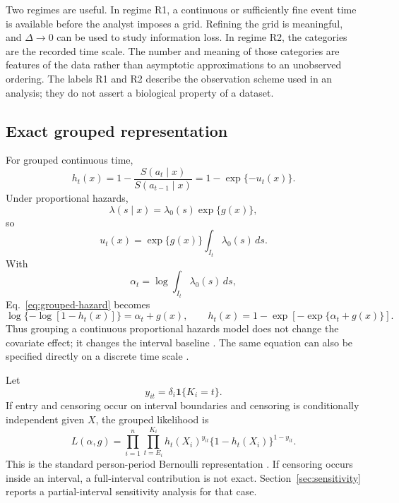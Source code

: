 \documentclass[smallextended,natbib]{svjour3}
\begin{document}
Two regimes are useful. In regime R1, a continuous or sufficiently fine event time is available before the analyst imposes a grid. Refining the grid is meaningful, and $\Delta\to0$ can be used to study information loss. In regime R2, the categories are the recorded time scale. The number and meaning of those categories are features of the data rather than asymptotic approximations to an unobserved ordering. The labels R1 and R2 describe the observation scheme used in an analysis; they do not assert a biological property of a dataset.

\subsection{Exact grouped representation}
\label{sec:grouped-representation}

For grouped continuous time,
\begin{equation}
h_t(x)=1-\frac{S(a_t\mid x)}{S(a_{t-1}\mid x)}
       =1-\exp\{-u_t(x)\}.
\label{eq:grouped-hazard}
\end{equation}
Under proportional hazards,
\begin{equation}
\lambda(s\mid x)=\lambda_0(s)\exp\{g(x)\},
\label{eq:ph}
\end{equation}
so
\begin{equation}
u_t(x)=\exp\{g(x)\}\int_{I_t}\lambda_0(s)\,ds.
\end{equation}
With
\begin{equation}
\alpha_t=\log\int_{I_t}\lambda_0(s)\,ds,
\end{equation}
Eq.~\eqref{eq:grouped-hazard} becomes
\begin{equation}
\log\{-\log[1-h_t(x)]\}=\alpha_t+g(x),
\qquad
h_t(x)=1-\exp[-\exp\{\alpha_t+g(x)\}].
\label{eq:cloglog}
\end{equation}
Thus grouping a continuous proportional hazards model does not change the covariate effect; it changes the interval baseline \citep{prentice1978}. The same equation can also be specified directly on a discrete time scale \citep{allison1982,tutz2016}.

Let
\begin{equation}
y_{it}=\delta_i\mathbf 1\{K_i=t\}.
\end{equation}
If entry and censoring occur on interval boundaries and censoring is conditionally independent given $X$, the grouped likelihood is
\begin{equation}
L(\alpha,g)=
\prod_{i=1}^n\prod_{t=E_i}^{K_i}
 h_t(X_i)^{y_{it}}\{1-h_t(X_i)\}^{1-y_{it}}.
\label{eq:grouped-likelihood}
\end{equation}
This is the standard person-period Bernoulli representation \citep{prentice1978,tutz2016}. If censoring occurs inside an interval, a full-interval contribution is not exact. Section~\ref{sec:sensitivity} reports a partial-interval sensitivity analysis for that case.
\end{document}
